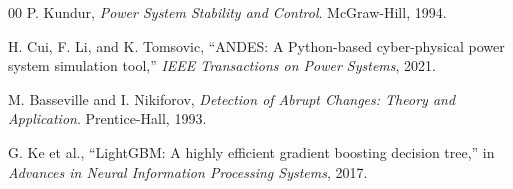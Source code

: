 \documentclass[11pt]{article}
\begin{document}
\begin{thebibliography}{00}
P. Kundur, \textit{Power System Stability and Control}. McGraw-Hill, 1994.

H. Cui, F. Li, and K. Tomsovic, ``ANDES: A Python-based cyber-physical power
system simulation tool,'' \textit{IEEE Transactions on Power Systems}, 2021.

M. Basseville and I. Nikiforov, \textit{Detection of Abrupt Changes: Theory and
Application}. Prentice-Hall, 1993.

G. Ke et al., ``LightGBM: A highly efficient gradient boosting decision tree,''
in \textit{Advances in Neural Information Processing Systems}, 2017.
\end{thebibliography}
\end{document}

